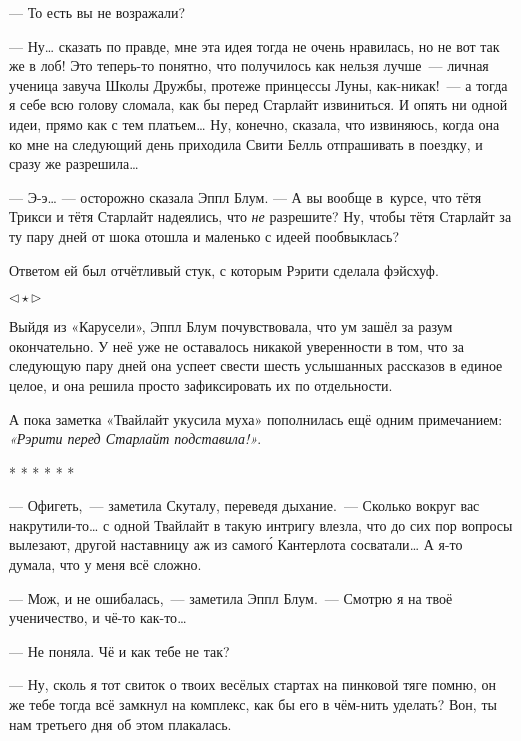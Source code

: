 \documentclass[fontsize=11pt,a5paper,titlepage=firstcover]{scrbook}
\begin{document}
--- То есть вы не возражали?

--- Ну{\ldots} сказать по правде, мне эта идея тогда не очень нравилась, но не вот так же в лоб! Это теперь-то понятно, что получилось как нельзя лучше~--- личная ученица завуча Школы Дружбы, протеже принцессы Луны, как-никак!~--- а тогда я себе всю голову сломала, как бы перед Старлайт извиниться. И опять ни одной идеи, прямо как с тем платьем{\ldots} Ну, конечно, сказала, что извиняюсь, когда она ко мне на следующий день приходила Свити Белль отпрашивать в поездку, и сразу же разрешила{\ldots}

--- Э-э{\ldots} --- осторожно сказала Эппл Блум. --- А вы вообще в~курсе, что тётя Трикси и тётя Старлайт надеялись, что \emph{не} разрешите? Ну, чтобы тётя Старлайт за ту пару дней от шока отошла и маленько с идеей пообвыклась?

Ответом ей был отчётливый стук, с которым Рэрити сделала фэйсхуф.
\begin{center}$\triangleleft\star\triangleright$\end{center}

Выйдя из «Карусели», Эппл Блум почувствовала, что ум зашёл за разум окончательно. У неё уже не оставалось никакой уверенности в том, что за следующую пару дней она успеет свести шесть услышанных рассказов в единое целое, и она решила просто зафиксировать их по отдельности.

А пока заметка «Твайлайт укусила муха» пополнилась ещё одним примечанием: \emph{«Рэрити перед Старлайт подставила!»}.

\vspace{2mm}
\begin{center}
	* * * * * *
\end{center}
\vspace{2mm}


--- Офигеть,~--- заметила Скуталу, переведя дыхание.~--- Сколько вокруг вас накрутили-то{\ldots} с одной Твайлайт в такую интригу влезла, что до сих пор вопросы вылезают, другой наставницу аж из самого́ Кантерлота сосватали{\ldots} А я-то думала, что у меня всё сложно.

--- Мож, и не ошибалась,~--- заметила Эппл Блум.~--- Смотрю я на твоё ученичество, и чё-то как-то{\ldots}

--- Не поняла. Чё и как тебе не так?

--- Ну, сколь я тот свиток о твоих весёлых стартах на пинковой тяге помню, он же тебе тогда всё замкнул на комплекс, как бы его в чём-нить уделать? Вон, ты нам третьего дня об этом плакалась.
\end{document}
